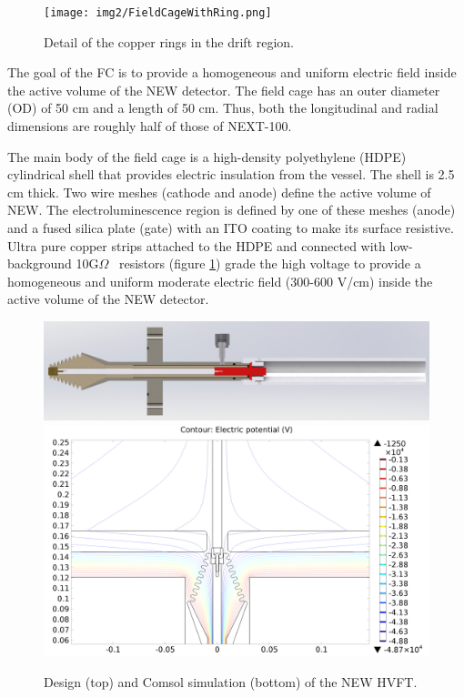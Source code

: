 \begin{figure}[hpt!]
\centering
\texttt{[image: img2/FieldCageWithRing.png]}
\caption{Detail of the copper rings in the drift region.} \label{fig:drift1}
\end{figure}

The goal of the FC is to provide a homogeneous and uniform electric field inside the active volume of the NEW detector. The field cage has an outer diameter (OD) of 50 cm and a length of 50 cm. Thus, both the longitudinal and radial dimensions are roughly half of those of NEXT-100. 

The main body of the field cage is a high-density polyethylene (HDPE) cylindrical shell that provides electric insulation from the vessel. The shell is 2.5 cm thick. Two wire meshes (cathode and anode) define the active volume of NEW. The electroluminescence region is defined by one of these meshes (anode) and a fused silica plate (gate) with an ITO coating to make its surface resistive. Ultra pure copper strips attached to the HDPE and connected with low-background 
10G$\Omega$~ resistors (figure \ref{fig:drift1}) grade the high voltage to provide a homogeneous and uniform moderate electric field (300-600 V/cm) inside the active volume of the NEW detector.


\begin{figure}[hpt!]
\centering
\includegraphics[width=\textwidth]{img2/HVFT_full_image.png}
\includegraphics[width=\textwidth]{img2/HVFT_with_drift.png}
\caption{Design (top) and Comsol simulation (bottom) of the NEW HVFT.} \label{fig:hvft1}
\end{figure}


